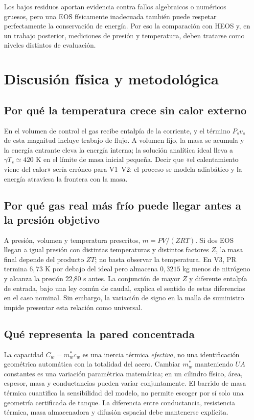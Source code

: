 \documentclass[11pt,letterpaper]{article}
\begin{document}
Los bajos residuos aportan evidencia contra fallos algebraicos o numéricos gruesos, pero una EOS físicamente inadecuada también puede respetar perfectamente la conservación de energía. Por eso la comparación con HEOS y, en un trabajo posterior, mediciones de presión y temperatura, deben tratarse como niveles distintos de evaluación.

\section{Discusión física y metodológica}
\subsection{Por qué la temperatura crece sin calor externo}
En el volumen de control el gas recibe entalpía de la corriente, y el término $P_sv_s$ de esta magnitud incluye trabajo de flujo. A volumen fijo, la masa se acumula y la energía entrante eleva la energía interna; la solución analítica ideal lleva a $\gamma T_s\simeq420$ K en el límite de masa inicial pequeña. Decir que «el calentamiento viene del calor» sería erróneo para V1--V2: el proceso se modela adiabático y la energía atraviesa la frontera con la masa.

\subsection{Por qué gas real más frío puede llegar antes a la presión objetivo}
A presión, volumen y temperatura prescritos, $m=PV/(ZRT)$. Si dos EOS llegan a igual presión con distintas temperaturas y distintos factores $Z$, la masa final depende del producto $ZT$; no basta observar la temperatura. En V3, PR termina $6,73$ K por debajo del ideal pero almacena $0,3215$ kg menos de nitrógeno y alcanza la presión 22,80 s antes. La conjunción de mayor $Z$ y diferente entalpía de entrada, bajo una ley común de caudal, explica el sentido de estas diferencias en el caso nominal. Sin embargo, la variación de signo en la malla de suministro impide presentar esta relación como universal.

\subsection{Qué representa la pared concentrada}
La capacidad $C_w=m_w^*c_w$ es una inercia térmica \emph{efectiva}, no una identificación geométrica automática con la totalidad del acero. Cambiar $m_w^*$ manteniendo $UA$ constantes es una variación paramétrica matemática; en un cilindro físico, área, espesor, masa y conductancias pueden variar conjuntamente. El barrido de masa térmica cuantifica la sensibilidad del modelo, no permite escoger por sí solo una geometría certificada de tanque. La diferencia entre conductancia, resistencia térmica, masa almacenadora y difusión espacial debe mantenerse explícita.
\end{document}
